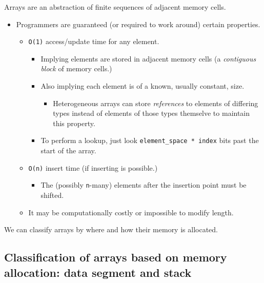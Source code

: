 \documentclass[11pt]{article}
\theoremstyle{definition}
\begin{document}
Arrays are an abstraction of finite sequences of
adjacent memory cells.
\begin{itemize}
\item Programmers are guaranteed (or required to work around) certain properties.
\begin{itemize}
\item \texttt{O(1)} access/update time for any element.
\begin{itemize}
\item Implying elements are stored in adjacent memory cells
(a \emph{contiguous block} of memory cells.)
\item Also implying each element is of a known, usually constant, size.
\begin{itemize}
\item Heterogeneous arrays can store \emph{references} to elements of differing types
instead of elements of those types themselve to maintain this property.
\end{itemize}
\item To perform a lookup, just look \texttt{element\_space * index} bits
past the start of the array.
\end{itemize}
\item \texttt{O(n)} insert time (if inserting is possible.)
\begin{itemize}
\item The (possibly \texttt{n}-many) elements after the insertion point
must be shifted.
\end{itemize}
\item It may be computationally costly or impossible to modify length.
\end{itemize}
\end{itemize}

We can classify arrays by where and how their memory is allocated.

\subsection{Classification of arrays based on memory allocation: data segment and stack}
\label{sec:orgd2c2b01}
\end{document}
